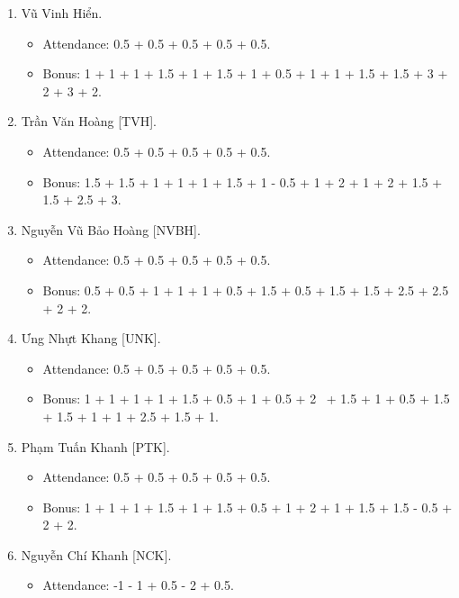 \documentclass{article}
\begin{document}
\begin{enumerate}
\begin{itemize}
        \item Attendance: 0.5 + 0.5 + 0.5 + 0.5 + 0.5.
        \item Bonus: 1 + 1 + 0.5 + 1.5 + 0.5 + 0.5 + 1 + 1 + 2 + 1.5.
    \end{itemize}
    \item {\sc Vũ Vinh Hiển.}
    \begin{itemize}
        \item Attendance: 0.5 + 0.5 + 0.5 + 0.5 + 0.5.
        \item Bonus: 1 + 1 + 1 + 1.5 + 1 + 1.5 + 1 + 0.5 + 1 + 1 + 1.5 + 1.5 + 3 + 2 + 3 + 2.
    \end{itemize}
    \item {\sc Trần Văn Hoàng [TVH].}
    \begin{itemize}
        \item Attendance: 0.5 + 0.5 + 0.5 + 0.5 + 0.5.
        \item Bonus: 1.5 + 1.5 + 1 + 1 + 1 + 1.5 + 1 - 0.5 + 1 + 2 + 1 + 2 + 1.5 + 1.5 + 2.5 + 3.
    \end{itemize}
    \item {\sc Nguyễn Vũ Bảo Hoàng [NVBH].}
    \begin{itemize}
        \item Attendance: 0.5 + 0.5 + 0.5 + 0.5 + 0.5.
        \item Bonus: 0.5 + 0.5 + 1 + 1 + 1 + 0.5 + 1.5 + 0.5 + 1.5 + 1.5 + 2.5 + 2.5 + 2 + 2.
    \end{itemize}
    \item {\sc Ưng Nhựt Khang [UNK].}
    \begin{itemize}
        \item Attendance: 0.5 + 0.5 + 0.5 + 0.5 + 0.5.
        \item Bonus: 1 + 1 + 1 + 1 + 1.5 + 0.5 + 1 + 0.5 + 2  + 1.5 + 1 + 0.5 + 1.5 + 1.5 + 1 + 1 + 2.5 + 1.5 + 1.
    \end{itemize}
    \item {\sc Phạm Tuấn Khanh [PTK].}
    \begin{itemize}
        \item Attendance: 0.5 + 0.5 + 0.5 + 0.5 + 0.5.
        \item Bonus: 1 + 1 + 1 + 1.5 + 1 + 1.5 + 0.5 + 1 + 2 + 1 + 1.5 + 1.5 - 0.5 + 2 + 2.
    \end{itemize}
    \item {\sc Nguyễn Chí Khanh [NCK].}
    \begin{itemize}
        \item Attendance: -1 - 1 + 0.5 - 2 + 0.5.

\end{itemize}
\end{enumerate}
\end{document}
